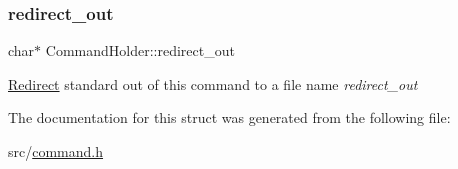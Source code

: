 \subsubsection{\texorpdfstring{redirect\+\_\+out}{redirect\_out}}
{\footnotesize\ttfamily char$\ast$ Command\+Holder\+::redirect\+\_\+out}

\hyperlink{structRedirect}{Redirect} standard out of this command to a file name {\itshape redirect\+\_\+out} 

The documentation for this struct was generated from the following file\+:\begin{DoxyCompactItemize}
\item 
src/\hyperlink{command_8h}{command.\+h}\end{DoxyCompactItemize}
